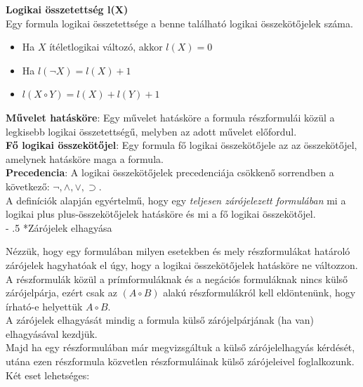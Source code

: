 \documentclass[tikz,12pt,margin=0px]{article}
\makeatletter
\renewcommand\paragraph{%
	\@startsection{paragraph}{4}{0mm}%
	{-\baselineskip}%
	{.5\baselineskip}%
	{\normalfont\normalsize\bfseries}}
\newcommand\lword[1]{\leavevmode\nobreak\hskip0pt plus\linewidth\penalty50\hskip0pt plus-\linewidth\nobreak #1}
\makeatother
\begin{document}
	\noindent \textbf{Logikai összetettség l(X)}\\
    \noindent Egy formula logikai összetettsége a benne található logikai összekötőjelek száma.
	\begin{itemize}
        \item Ha $X$ ítéletlogikai változó, akkor $l(X) = 0$
        \item Ha $l(\neg X) = l(X) + 1$
        \item $l(X \circ Y) = l(X) + l(Y)+1$
    \end{itemize}
	\noindent \textbf{Művelet hatásköre}: Egy művelet hatásköre a formula részformulái közül
	a legkisebb logikai összetettségű, melyben az adott művelet előfordul.\\
	
	\noindent \textbf{Fő logikai összekötőjel}: Egy formula fő logikai összekötőjele az az összekötőjel, amelynek
	hatásköre maga a formula.\\
	
	\noindent \textbf{Precedencia}: A logikai összekötőjelek precedenciája csökkenő sorrendben a következő: $\neg, \wedge, \vee, \supset$.\\
	
    \noindent A definíciók alapján egyértelmű, hogy egy \textit{teljesen zárójelezett formulában} mi a logikai \lword{összekötőjelek} hatásköre és mi a fő logikai összekötőjel.\\

    \paragraph*{Zárójelek elhagyása}

     \noindent Nézzük, hogy egy formulában milyen esetekben és mely részformulákat határoló zárójelek hagyhatóak el úgy, hogy a logikai összekötőjelek hatásköre ne változzon.\\

     \noindent A részformulák közül a prímformuláknak és a negációs formuláknak nincs külső zárójelpárja, ezért csak az $(A \circ B)$ alakú részformulákról kell eldöntenünk, hogy írható-e helyettük $A \circ B$.\\
     A zárójelek elhagyását mindig a formula külső zárójelpárjának (ha van) elhagyásával kezdjük.\\

     \noindent Majd ha egy részformulában már megvizsgáltuk a külső zárójelelhagyás kérdését, utána ezen részformula közvetlen részformuláinak külső zárójeleivel foglalkozunk. Két eset lehetséges:
	
\end{document}
